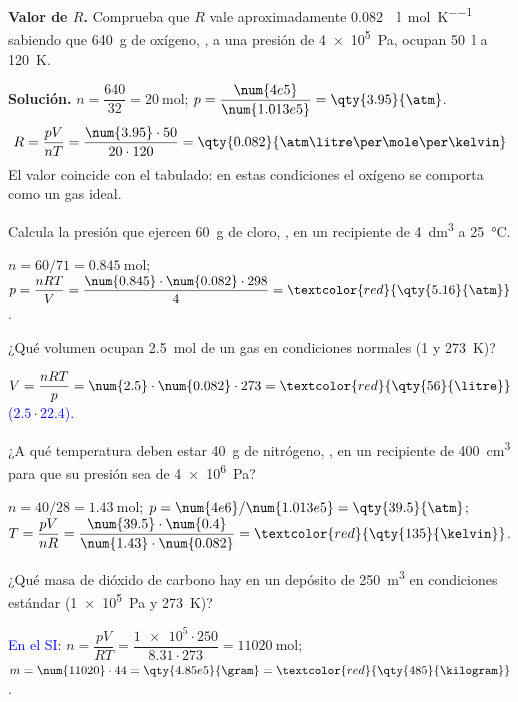 \begin{example}
    \textbf{Valor de \(R\).} Comprueba que \(R\) vale aproximadamente \qty{0.082}{\atm\litre\per\mole\per\kelvin} sabiendo que
    \qty{640}{\gram} de oxígeno, , a una presión de \qty{4e5}{\pascal}, ocupan \qty{50}{\litre} a \qty{120}{\kelvin}.

    \textbf{Solución.} \(n = \dfrac{640}{32} = \qty{20}{\mole}\); \(p = \dfrac{\num{4e5}}{\num{1.013e5}} = \qty{3.95}{\atm}\).
    \[ R = \frac{p V}{n T} = \frac{\num{3.95} \cdot 50}{20 \cdot 120} = \qty{0.082}{\atm\litre\per\mole\per\kelvin} \]
    El valor coincide con el tabulado: en estas condiciones el oxígeno se comporta como un gas ideal.
\end{example}

\begin{exercise}
    Calcula la presión que ejercen \qty{60}{\gram} de cloro, , en un recipiente de \qty{4}{\cubic\deci\metre} a
    \qty{25}{\degreeCelsius}.
    \begin{solu}
        \(n = 60/71 = \qty{0.845}{\mole}\); \(p = \dfrac{n R T}{V} = \dfrac{\num{0.845} \cdot \num{0.082} \cdot 298}{4} =
        \textcolor{red}{\qty{5.16}{\atm}}\).
    \end{solu}
\end{exercise}

\begin{exercise}
    ¿Qué volumen ocupan \qty{2.5}{\mole} de un gas en condiciones normales (\qty{1}{\atm} y \qty{273}{\kelvin})?
    \begin{solu}
        \(V = \dfrac{n R T}{p} = \num{2.5} \cdot \num{0.082} \cdot 273 = \textcolor{red}{\qty{56}{\litre}}\) \textcolor{blue}{(\(\num{2.5} \cdot \num{22.4}\)).}
    \end{solu}
\end{exercise}

\begin{exercise}
    ¿A qué temperatura deben estar \qty{40}{\gram} de nitrógeno, , en un recipiente de \qty{400}{\cubic\centi\metre} para
    que su presión sea de \qty{4e6}{\pascal}?
    \begin{solu}
        \(n = 40/28 = \qty{1.43}{\mole}\); \(p = \num{4e6}/\num{1.013e5} = \qty{39.5}{\atm}\);
        \(T = \dfrac{p V}{n R} = \dfrac{\num{39.5} \cdot \num{0.4}}{\num{1.43} \cdot \num{0.082}} = \textcolor{red}{\qty{135}{\kelvin}}\).
    \end{solu}
\end{exercise}

\begin{exercise}
    ¿Qué masa de dióxido de carbono hay en un depósito de \qty{250}{\cubic\metre} en condiciones estándar
    (\qty{1e5}{\pascal} y \qty{273}{\kelvin})?
    \begin{solu}
        \textcolor{blue}{En el SI:} \(n = \dfrac{p V}{R T} = \dfrac{\num{1e5} \cdot 250}{\num{8.31} \cdot 273} = \qty{11020}{\mole}\);
        \(m = \num{11020} \cdot 44 = \qty{4.85e5}{\gram} = \textcolor{red}{\qty{485}{\kilogram}}\).
    \end{solu}
\end{exercise}

